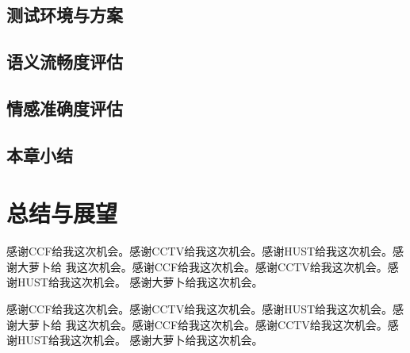 \documentclass[supercite]{HustGraduPaper}
\theoremstyle{definition}
\begin{document}
\subsection{测试环境与方案}
\subsection{语义流畅度评估}
\subsection{情感准确度评估}
\subsection{本章小结}
\section{总结与展望}

\begin{thankpage}

感谢CCF给我这次机会。感谢CCTV给我这次机会。感谢HUST给我这次机会。感谢大萝卜给
我这次机会。感谢CCF给我这次机会。感谢CCTV给我这次机会。感谢HUST给我这次机会。
感谢大萝卜给我这次机会。

感谢CCF给我这次机会。感谢CCTV给我这次机会。感谢HUST给我这次机会。感谢大萝卜给
我这次机会。感谢CCF给我这次机会。感谢CCTV给我这次机会。感谢HUST给我这次机会。
感谢大萝卜给我这次机会。

\end{thankpage}

\nocite{*}


\end{document}
